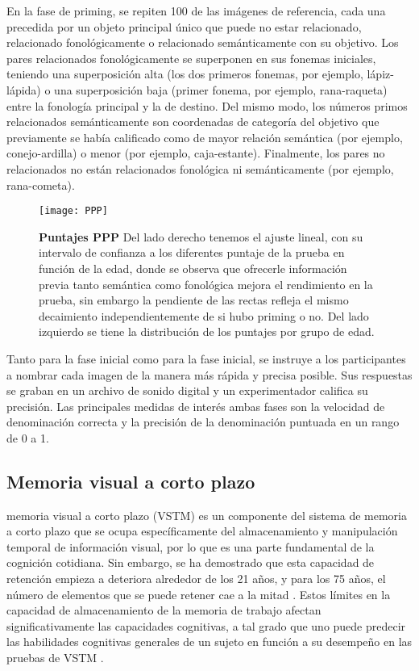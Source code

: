 \documentclass[11pt,letterpaper]{article}
\numberwithin{equation}{subsection}
\numberwithin{table}{subsection}
\begin{document}
\bigskip
\noindent En la fase de priming, se repiten 100 de las imágenes de referencia, cada una precedida por un objeto principal único que puede no estar relacionado, relacionado fonológicamente o relacionado semánticamente con su objetivo. Los pares relacionados fonológicamente se superponen en sus fonemas iniciales, teniendo una superposición alta (los dos primeros fonemas, por ejemplo, lápiz-lápida) o una superposición baja (primer fonema, por ejemplo, rana-raqueta) entre la fonología principal y la de destino. Del mismo modo, los números primos relacionados semánticamente son coordenadas de categoría del objetivo que previamente se había calificado como de mayor relación semántica (por ejemplo, conejo-ardilla) o menor (por ejemplo, caja-estante). Finalmente, los pares no relacionados no están relacionados fonológica ni semánticamente (por ejemplo, rana-cometa). 

\begin{figure}[H]
\centering
	\texttt{[image: PPP]}
	\captionsetup{labelfont=bf}
	\caption{\scriptsize\textbf{Puntajes PPP} Del lado derecho tenemos el ajuste lineal, con su intervalo de confianza a los diferentes puntaje de la prueba en función de la edad, donde se observa que ofrecerle información previa tanto semántica como fonológica mejora el rendimiento en la prueba, sin embargo la pendiente de las rectas refleja el mismo decaimiento independientemente de si hubo priming o no. Del lado izquierdo se tiene la distribución de los puntajes por grupo de edad.}
	\label{fig:PPP}
\end{figure}


\bigskip
\noindent Tanto para la fase inicial como para la fase inicial, se instruye a los participantes a nombrar cada imagen de la manera más rápida y precisa posible. Sus respuestas se graban en un archivo de sonido digital y un experimentador califica su precisión. Las principales medidas de interés ambas fases son la velocidad de denominación correcta y la precisión de la denominación puntuada en un rango de 0 a 1. 



\subsection{Memoria visual a corto plazo}

\noindent memoria visual a corto plazo (VSTM) es un componente del sistema de memoria a corto plazo que se ocupa específicamente del almacenamiento y manipulación temporal de información visual, por lo que es una parte fundamental de la cognición cotidiana. Sin embargo, se ha demostrado que esta capacidad de retención empieza a deteriora alrededor de los 21 años, y para los 75 años, el número de elementos que se puede retener cae a la mitad \cite{mitchell2018visual}. Estos límites en la capacidad de almacenamiento de la memoria de trabajo afectan significativamente las capacidades cognitivas, a tal grado que uno puede predecir las habilidades cognitivas generales de un sujeto en función a su desempeño en las pruebas de VSTM \cite{baddeley1999working}. 
\end{document}
